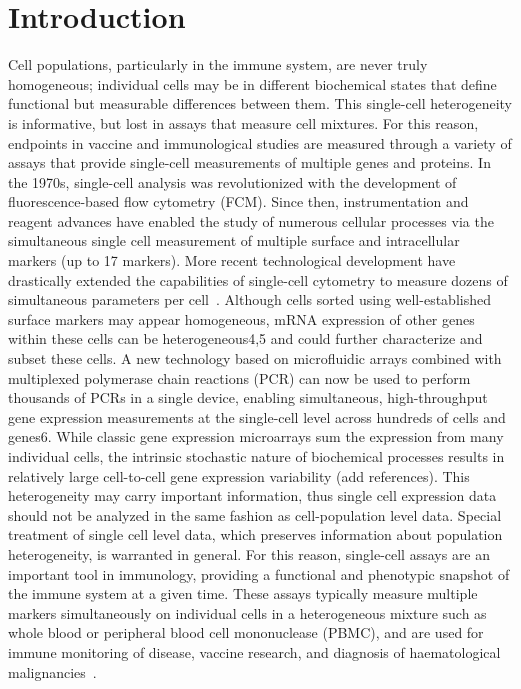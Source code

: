 \documentclass[11pt]{article}
\begin{document}
\section{Introduction}
Cell populations, particularly in the immune system, are never truly homogeneous; individual cells may be in different biochemical states that define functional but measurable differences between them. This single-cell heterogeneity is informative, but lost in assays that measure cell mixtures. For this reason, endpoints in vaccine and immunological studies are measured through a variety of assays that provide single-cell measurements of multiple genes and proteins. In the 1970s, single-cell analysis was revolutionized with the development of fluorescence-based flow cytometry (FCM). Since then, instrumentation and reagent advances have enabled the study of numerous cellular processes via the simultaneous single cell measurement of multiple surface and intracellular markers (up to 17 markers). More recent technological development have drastically extended the capabilities of single-cell cytometry to measure dozens of simultaneous parameters per cell~\citep{Bendall:2011wf}. Although cells sorted using well-established surface markers may appear homogeneous, mRNA expression of other genes within these cells can be heterogeneous4,5 and could further characterize and subset these cells. A new technology based on microfluidic arrays combined with multiplexed polymerase chain reactions (PCR) can now be used to perform thousands of PCRs in a single device, enabling simultaneous, high-throughput gene expression measurements at the single-cell level across hundreds of cells and genes6. While classic gene expression microarrays sum the expression from many individual cells, the intrinsic stochastic nature of biochemical processes results in relatively large cell-to-cell gene expression variability (add references). This heterogeneity may carry important information, thus single cell expression data should not be analyzed in the same fashion as cell-population level data. Special treatment of single cell level data, which preserves information about population heterogeneity, is warranted in general. For this reason, single-cell assays are an important tool in immunology, providing a functional and phenotypic snapshot of the immune system at a given time. These assays typically measure multiple markers simultaneously on individual cells in a heterogeneous mixture such as whole blood or peripheral blood cell mononuclease (PBMC), and are used for immune monitoring of disease, vaccine research, and diagnosis of haematological malignancies~\cite{Altman:1996wf,Betts:2006dw,Inokuma:2007tn}.
\end{document}
